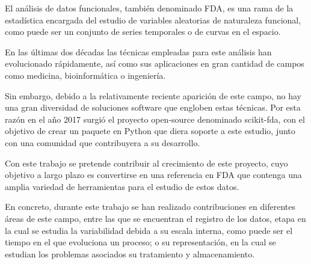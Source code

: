 El análisis de datos funcionales, también denominado FDA, es una rama de la 
estadística encargada del estudio de variables aleatorias de naturaleza
funcional, como puede ser un conjunto de series temporales o de curvas en el
espacio.

En las últimas dos décadas las técnicas empleadas para este análisis han
evolucionado rápidamente, así como sus aplicaciones en gran cantidad de campos
como medicina, bioinformática o ingeniería.

Sin embargo, debido a la relativamente reciente aparición de este campo, no hay
una gran diversidad de soluciones software que engloben estas técnicas. Por esta
razón en el año 2017 surgió el proyecto open-source denominado scikit-fda, con
el objetivo de crear un paquete en Python que diera soporte a este estudio,
junto con una comunidad que contribuyera a su desarrollo.

Con este trabajo se pretende contribuir al crecimiento de este proyecto, cuyo
objetivo a largo plazo es convertirse en una referencia en FDA que contenga una
amplia variedad de herramientas para el estudio de estos datos.

En concreto, durante este trabajo se han realizado contribuciones en diferentes
áreas de este campo, entre las que se encuentran el registro de los datos, etapa
en la cual se estudia la variabilidad debida a su escala interna, como puede
ser el tiempo en el que evoluciona un proceso; o su representación, en la cual
se estudian los problemas asociados su tratamiento y almacenamiento.
